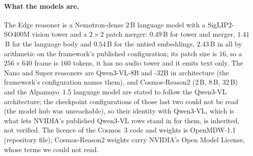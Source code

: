 \paragraph{What the models are.}
The Edge reasoner is a Nemotron-dense $2$\,B language model with a SigLIP2-SO400M vision tower and a $2\times2$ patch merger: $0.49$\,B for tower and merger, $1.41$\,B for the language body and $0.54$\,B for the untied embeddings, $2.43$\,B in all by arithmetic on the framework's published configuration\evM; its patch size is $16$, so a $256\times640$ frame is $160$ tokens, it has no audio tower and it emits text only. The Nano and Super reasoners are Qwen3-VL-8B and -32B in architecture (the framework's configuration names them), and Cosmos-Reason2 (2\,B, 8\,B, 32\,B) and the Alpamayo~1.5 language model are stated to follow the Qwen3-VL architecture; the checkpoint configurations of those last two could not be read (the model hub was unreachable), so their identity with Qwen3-VL, which is what lets NVIDIA's published Qwen3-VL rows stand in for them, is inherited, not verified\evI. The licence of the Cosmos~3 code and weights is OpenMDW-1.1 (repository file); Cosmos-Reason2 weights carry NVIDIA's Open Model License, whose terms we could not read.

